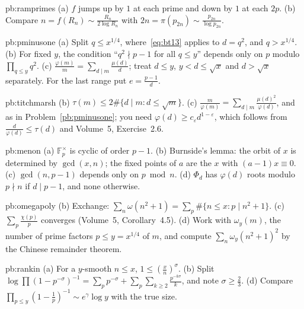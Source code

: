 \begin{hint}{pb:ramprimes}
(a) $f$ jumps up by $1$ at each prime and down by $1$ at each $2p$. (b) Compare $n=f(R_n)\sim\frac{R_n}{2\log R_n}$ with $2n=\pi(p_{2n})\sim\frac{p_{2n}}{\log p_{2n}}$.
\end{hint}

\begin{hint}{pb:pminusone}
(a) Split $q\le x^{1/4}$, where~\eqref{eq:bt13} applies to $d=q^2$, and $q>x^{1/4}$. (b) For fixed $y$, the condition ``$q^2\nmid p-1$ for all $q\le y$'' depends only on $p$
modulo $\prod_{q\le y}q^2$. (c) $\frac{\varphi(m)}m=\sum_{d\mid m}\frac{\mu(d)}d$; treat $d\le y$, $y<d\le\sqrt x$ and $d>\sqrt x$ separately. For the last range put $e=\frac{p-1}d$.
\end{hint}

\begin{hint}{pb:titchmarsh}
(b) $\tau(m)\le2\#\{d\mid m:d\le\sqrt m\}$. (c) $\frac m{\varphi(m)}=\sum_{d\mid m}\frac{\mu(d)^2}{\varphi(d)}$, and as in Problem~\ref{pb:pminusone}; you need $\varphi(d)\ge c_\varepsilon d^{1-\varepsilon}$,
which follows from $\frac d{\varphi(d)}\le\tau(d)$ and Volume~5, Exercise~2.6.
\end{hint}

\begin{hint}{pb:menon}
(a) $\mathbb F_p^\times$ is cyclic of order $p-1$. (b) Burnside's lemma: the orbit of $x$ is determined by $\gcd(x,n)$; the fixed points of $a$ are the $x$ with $(a-1)x\equiv0$.
(c) $\gcd(n,p-1)$ depends only on $p\bmod n$. (d) $\Phi_d$ has $\varphi(d)$ roots modulo $p\nmid n$ if $d\mid p-1$, and none otherwise.
\end{hint}

\begin{hint}{pb:omegapoly}
(b) Exchange: $\sum_n\omega(n^2+1)=\sum_p\#\{n\le x:p\mid n^2+1\}$. (c) $\sum_p\frac{\chi(p)}p$ converges (Volume~5, Corollary~4.5). (d) Work with $\omega_y(m)$, the number of prime
factors $p\le y=x^{1/4}$ of $m$, and compute $\sum_n\omega_y(n^2+1)^2$ by the Chinese remainder theorem.
\end{hint}

\begin{hint}{pb:rankin}
(a) For a $y$-smooth $n\le x$, $1\le(\frac xn)^\sigma$. (b) Split $\log\prod(1-p^{-\sigma})^{-1}=\sum_pp^{-\sigma}+\sum_p\sum_{k\ge2}\frac{p^{-k\sigma}}k$, and note $\sigma\ge\frac23$.
(d) Compare $\prod_{p\le y}(1-\frac1p)^{-1}\sim e^\gamma\log y$ with the true size.
\end{hint}

